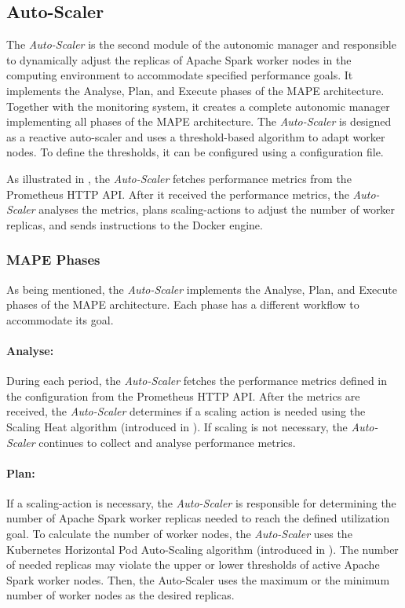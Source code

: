 \subsection{Auto-Scaler}
The \textit{Auto-Scaler} is the second module of the autonomic manager and responsible to dynamically adjust the replicas of Apache Spark worker nodes in the computing environment to accommodate specified performance goals. 
It implements the Analyse, Plan, and Execute phases of the MAPE architecture. Together with the monitoring system, it creates a complete autonomic manager implementing all phases of the MAPE architecture.
The \textit{Auto-Scaler} is designed as a reactive auto-scaler and uses a threshold-based algorithm to adapt worker nodes. To define the thresholds, it can be configured using a configuration file.


As illustrated in , the \textit{Auto-Scaler} fetches performance metrics from the Prometheus HTTP API.
After it received the performance metrics, the \textit{Auto-Scaler} analyses the metrics, plans scaling-actions to adjust the number of worker replicas, and sends instructions to the Docker engine.


\subsubsection{MAPE Phases}
As being mentioned, the \textit{Auto-Scaler} implements the Analyse, Plan, and Execute phases of the MAPE architecture. Each phase has a different workflow to accommodate its goal.

\paragraph{Analyse:}
During each period, the \textit{Auto-Scaler} fetches the performance metrics defined in the configuration from the Prometheus HTTP API.
After the metrics are received, the \textit{Auto-Scaler} determines if a scaling action is needed using the Scaling Heat algorithm (introduced in ). If scaling is not necessary, the \textit{Auto-Scaler} continues to collect and analyse performance metrics.

\paragraph{Plan:}
If a scaling-action is necessary, the \textit{Auto-Scaler} is responsible for determining the number of Apache Spark worker replicas needed to reach the defined utilization goal.
To calculate the number of worker nodes, the \textit{Auto-Scaler} uses the Kubernetes Horizontal Pod Auto-Scaling algorithm (introduced in ).
The number of needed replicas may violate the upper or lower thresholds of active Apache Spark worker nodes. Then, the Auto-Scaler uses the maximum or the minimum number of worker nodes as the desired replicas.

